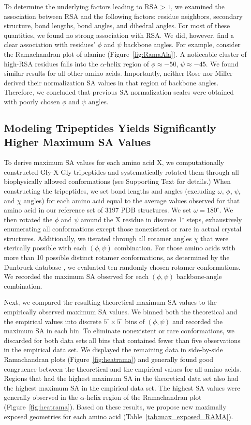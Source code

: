 \documentclass[11pt]{article}
\begin{document}
To determine the underlying factors leading to $\text{RSA}>1$, we examined the association between RSA and the following factors: residue neighbors, secondary structure, bond lengths, bond angles, and dihedral angles. For most of these quantities, we found no strong association with RSA. We did, however, find a clear association with residues' $\phi$ and $\psi$ backbone angles. For example, consider the Ramachandran plot of alanine (Figure~\ref{fig:RamaAla}). A noticeable cluster of high-RSA residues falls into the $\alpha$-helix region of $\phi\approx-50$, $\psi\approx-45$. We found similar results for all other amino acids. Importantly, neither Rose nor Miller derived their normalization SA values in that region of backbone angles. Therefore, we concluded that previous SA normalization scales were obtained with poorly chosen $\phi$ and $\psi$ angles.

\subsection*{Modeling Tripeptides Yields Significantly Higher Maximum SA Values}
To derive maximum SA values for each amino acid X, we computationally constructed Gly-X-Gly tripeptides and systematically rotated them through all biophysically allowed  conformations (see Supporting Text for details.) When constructing the tripeptides, we set bond lengths and angles (excluding $\omega$, $\phi$, $\psi$, and $\chi$ angles) for each amino acid equal to the average values observed for that amino acid in our reference set of 3197 PDB structures. We set $\omega=180^\circ$. We then rotated the $\phi$ and $\psi$ around the X residue in  discrete 1$^\circ$ steps, exhaustively enumerating all conformations except those nonexistent or rare in actual crystal structures. Additionally, we iterated through all rotamer angles $\chi$ that were sterically possible with each $(\phi, \psi)$ combination. For those amino acids with more than 10 possible distinct rotamer conformations, as determined by the Dunbruck database \cite{WangDunbrack2003}, we evaluated ten randomly chosen rotamer conformations. We recorded the maximum SA observed for each $(\phi, \psi)$ backbone-angle combination.

Next, we compared the resulting theoretical maximum SA values to the empirically observed maximum SA values. We binned both the theoretical and the empirical values into discrete $5^\circ\times5^\circ$ bins of $(\phi, \psi)$ and recorded the maximum SA in each bin. To eliminate nonexistent or rare conformations, we discarded for both data sets all bins that contained fewer than five observations in the empirical data set. We displayed the remaining data in side-by-side Ramachandran plots (Figure~\ref{fig:heatrama}) and generally found good congruence between the theoretical and the empirical values for all amino acids. Regions that had the highest maximum SA in the theoretical data set also had the highest maximum SA in the empirical data set. The highest SA values were generally observed in the $\alpha$-helix region of the Ramachandran plot (Figure~\ref{fig:heatrama}). Based on these results, we propose new maximally exposed geometries for each amino acid (Table~\ref{tab:max_exposed_RAMA}).
\end{document}
